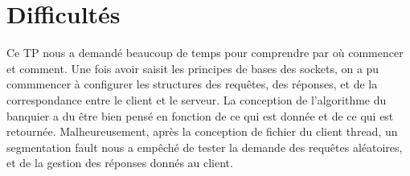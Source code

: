\documentclass[11pt]{article}
\begin{document}
\section{Difficultés}
Ce TP nous a demandé beaucoup de temps pour comprendre par où commencer et comment. Une fois avoir saisit les principes de bases des sockets, on a pu commmencer à configurer les structures des requêtes, des réponses, et de la correspondance entre le client et le serveur. La conception de l'algorithme du banquier a du être bien pensé en fonction de ce qui est donnée et de ce qui est retournée. Malheureusement, après la conception de fichier du client thread, un segmentation fault nous a empêché de tester la demande des requêtes aléatoires, et de la gestion des réponses donnés au client. 
\end{document}
